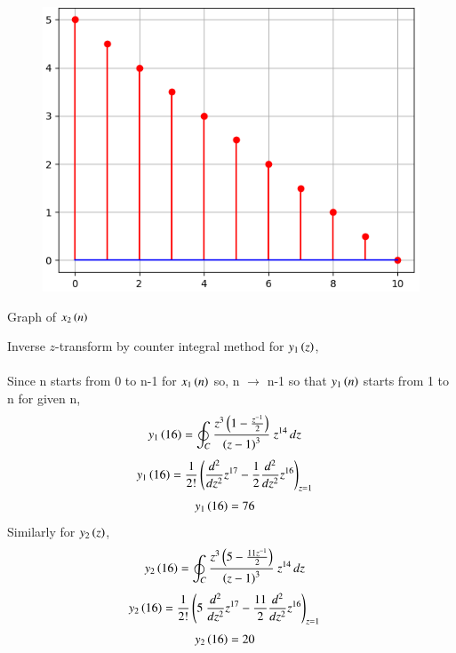 \documentclass[beamer]{IEEEtran}
\theoremstyle{remark}
\begin{document}
\begin{figure}[h]
    \centering
    \includegraphics[scale=0.60]{figs/py_5.png}
    \label{fig:x2n}
\end{figure}
\begin{center}
    Graph of $x_2\left(n\right)$\\[20ex]
\end{center}
Inverse $z$-transform by counter integral method for  $y_1\left(z\right)$,\\\\Since n starts from 0 to n-1 for $x_1\left(n\right)$ so, n $\to$ n-1 so that $y_1\left(n\right)$ starts from 1 to n for given n,\\
\begin{align}
y_1\left(16\right)&=\oint_C \frac{z^3\left(1-\frac{z^{-1}}{2}\right)}{\left(z-1\right)^3}\ z^{14}\, dz
\end{align}
\begin{align}
y_1\left(16\right)&=\frac{1}{2!}\left(\frac{d^2}{dz^2}z^{17}-\frac{1}{2}\frac{d^2}{dz^2}z^{16}\right)_{z=1}  
\end{align}
\begin{align}
y_1\left(16\right)&=76
\end{align}
Similarly for $y_2\left(z\right)$,
\begin{align}
y_2\left(16\right)&=\oint_C \frac{z^3\left(5-\frac{11z^{-1}}{2}\right)}{\left(z-1\right)^3}\ z^{14}\, dz
\end{align}
\begin{align}
y_2\brak{16}&=\frac{1}{2!}\brak{5\ \frac{d^2}{dz^2}z^{17}-\frac{11}{2}\frac{d^2}{dz^2}z^{16}}_{z=1}  
\end{align}
\begin{align}
y_2\left(16\right)&=20
\end{align}
\end{document}
